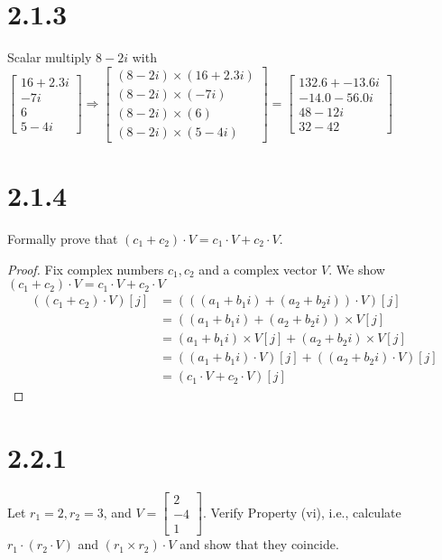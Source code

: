 \documentclass[11pt]{article}
\begin{document}
\section{2.1.3}
Scalar multiply $8 - 2i$ with $\begin{bmatrix}
				16 + 2.3i \\
				-7i \\
				6 \\
				5 - 4i
				\end{bmatrix} \Rightarrow  
\begin{bmatrix}
	(8-2i) \times (16 + 2.3i) \\
	(8-2i) \times (-7i) \\
	(8-2i) \times (6) \\
	(8-2i) \times (5 - 4i)
\end{bmatrix}
=
\begin{bmatrix}
	132.6 + -13.6i \\
	-14.0 - 56.0i \\
	48 - 12i \\
	32 - 42
\end{bmatrix} $

\section{2.1.4}
Formally prove that $(c_1 + c_2) \cdot V = c_1 \cdot V + c_2 \cdot V$.

\begin{proof}
	Fix complex numbers $c_1, c_2$ and a complex vector $V$. We show $(c_1 + c_2) \cdot V = c_1 \cdot V + c_2 \cdot V$
	\begin{align*}
		((c_1 + c_2) \cdot V)[j] &= (((a_1+b_1i) + (a_2+b_2i)) \cdot V)[j] \\
					 &= ((a_1+b_1i) + (a_2+b_2i)) \times V[j] \\
					 &= (a_1+b_1i) \times V[j] + (a_2+b_2i) \times V[j] \\
					 &= ((a_1 + b_1i) \cdot V)[j] + ((a_2 + b_2i) \cdot V)[j] \\
					 &= (c_1 \cdot V + c_2 \cdot V)[j]
	\end{align*}
\end{proof}
\newpage

\section{2.2.1} Let $r_1 = 2, r_2 = 3$, and $V = \begin{bmatrix}2 \\ -4 \\ 1 \end{bmatrix}$.
	Verify Property (vi), i.e., calculate $r_1 \cdot (r_2 \cdot V)$ and $(r_1 \times r_2) \cdot V$ and show that they coincide.
\end{document}
